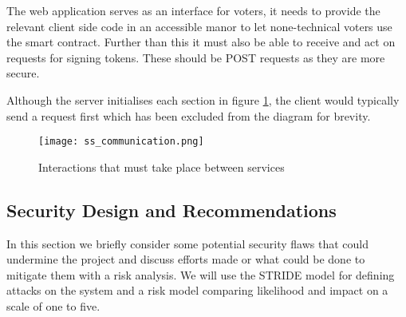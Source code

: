 \documentclass{entcs}
\begin{document}
The web application serves as an interface for voters, it needs to provide the relevant client side code in an accessible manor to let none-technical voters use the smart contract. Further than this it must also be able to receive and act on requests for signing tokens. These should be POST requests as they are more secure.

Although the server initialises each section in figure \ref{fig:communication}, the client would typically send a request first which has been excluded from the diagram for brevity. 

\begin{figure}[h!]
    \centering
    \texttt{[image: ss\_communication.png]}
    \caption{Interactions that must take place between services}
    \label{fig:communication}
\end{figure}


\newpage
\subsection{Security Design and Recommendations} \label{sec: security design}
In this section we briefly consider some potential security flaws that could undermine the project and discuss efforts made or what could be done to mitigate them with a risk analysis. We will use the STRIDE model \cite{STRIDE} for defining attacks on the system and a risk model comparing likelihood and impact on a scale of one to five.
\end{document}
